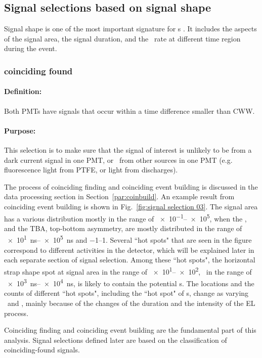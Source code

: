 \subsection{Signal selections based on signal shape}
Signal shape is one of the most important signature for \ees s . It includes the aspects of the signal area, the signal duration, and the \sphe\ rate at different time region during the event.
\subsubsection{coinciding found}
\label{sec:cuts coindence found}
\paragraph{Definition:}
Both PMTs have signals that occur within a time difference smaller than CWW. 
\paragraph{Purpose:}
This selection is to make sure that the signal of interest is unlikely to be from a dark current signal in one PMT, %
or \sphe\ from other sources in one PMT (e.g. fluorescence light from PTFE, or light from discharges). 

The process of coinciding finding and coinciding event building is discussed in the data processing section in Section~\ref{par:coinbuild}. An example result from coinciding event building is shown in Fig.~\ref{fig:signal selection 03}. The signal area has a various distribution mostly in the range of \SIrange{e-1}{e5}{\phe}, when the \rpd, and the TBA, top-bottom asymmetry, are mostly distributed in the range of \SIrange{e1}{e5}{\ns} and \numrange{-1}{1}. Several ``hot spots" that are seen in the figure correspond to different activities in the detector, which will be explained later in each separate section of signal selection. Among these ``hot spots", the horizontal strap shape spot at signal area in the range of \SIrange{e1}{e2}{\phe}, \rpd\ in the range of \SIrange{e3}{e4}{\ns}, is likely to contain the potential \ees s. The locations and the counts of  different ``hot spots", including the ``hot spot" of \ees s, change as varying \opdv\ and \opgd , mainly because of the changes of the duration and the intensity of the EL process.  

Coinciding finding and coinciding event building are the fundamental part of this analysis. Signal selections defined later are based on the classification of coinciding-found signals. 

